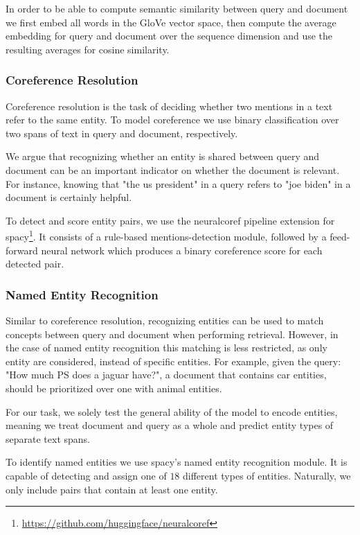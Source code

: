 In order to be able to compute semantic similarity between query and document we first embed all words in the GloVe \cite{pennington2014glove} vector space, then compute the average embedding for query and document over the sequence dimension and use the resulting averages for cosine similarity.

\subsubsection{Coreference Resolution}
Coreference resolution is the task of deciding whether two mentions in a text refer to the same entity. To model coreference we use binary classification over two spans of text in query and document, respectively.

We argue that recognizing whether an entity is shared between query and document can be an important indicator on whether the document is relevant. For instance, knowing that "the us president" in a query refers to "joe biden" in a document is certainly helpful.

To detect and score entity pairs, we use the neuralcoref pipeline extension for spacy\footnote{\url{https://github.com/huggingface/neuralcoref}}. It consists of a rule-based mentions-detection module, followed by a feed-forward neural network which produces a binary coreference score for each detected pair.

\subsubsection{Named Entity Recognition}
Similar to coreference resolution, recognizing entities can be used to match concepts between query and document when performing retrieval. However, in the case of named entity recognition this matching is less restricted, as only entity  are considered, instead of specific entities. For example, given the query: "How much PS does a jaguar have?", a document that contains car entities, should be prioritized over one with animal entities.

For our task, we solely test the general ability of the model to encode entities, meaning we treat document and query as a whole and predict entity types of separate text spans.

To identify named entities we use spacy's \cite{spacy2} named entity recognition module. It is capable of detecting and assign one of $18$ different types of entities. Naturally, we only include pairs that contain at least one entity.

